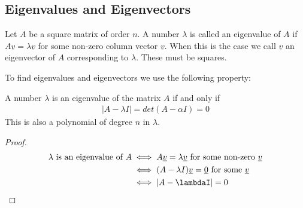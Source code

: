 \documentclass[a4paper]{article}
\theoremstyle{plain}
\theoremstyle{definition}
\newtheorem{defn}{Definition}[section]
\theoremstyle{remark}
\begin{document}
\subsection{Eigenvalues and Eigenvectors}
\begin{tcolorbox}[colback=black!3!white,colframe=black!60!white,title=\begin{defn}Eigenvalues and Eigenvectors \label{Eigenvalues}\end{defn}]
Let $A$ be a square matrix of order $n$. A number $\lambda$ is called an eigenvalue of $A$ if $A \underline{v} = \lambda \underline{v}$ for some non-zero column vector $\underline{v}$. When this is the case we call $ \underline{v}$ an eigenvector of $A$ corresponding to $\lambda$. These must be squares.
\end{tcolorbox}
To find eigenvalues and eigenvectors we use the following property: \\
\begin{tcolorbox}[colback=black!3!white,colframe=black!60!white,title=\begin{defn}Characteristic Equation \label{Characteristic Equation}\end{defn}]
A number $\lambda$ is an eigenvalue of the matrix $A$ if and only if
\begin{align}
|A - \lambda I| = det(A - \alpha I) = 0
\end{align}
This is also a polynomial of degree $n$ in $\lambda$.
\begin{proof}
	\begin{align}
		\lambda \text{ is an eigenvalue of $A$} &\iff A\underline{v} = \lambda \underline{v} \text{ for some non-zero $\underline{v}$} \\
							&\iff (A - \lambda I)\underline{v} = \underline{0} \text{ for some $\underline{v}$} \\
							& \iff |A - \lambdaI | = 0
	\end{align}
\end{proof}
\end{tcolorbox}
\end{document}

